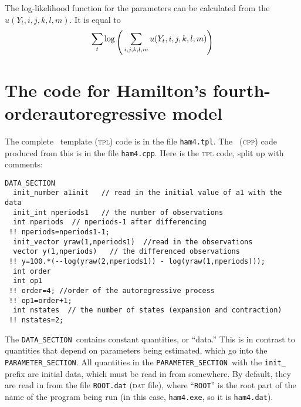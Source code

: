 \documentclass{admbmanual}
\newcommand\DS{\texttt{DATA\_SECTION}}
\newcommand\PS{\texttt{PARAMETER\_SECTION}}
\begin{document}
The log-likelihood function for the parameters can be calculated from the
$u(Y_t,i,j,k,l,m)$. It is equal to
\begin{equation}
{
\sum_t \log\raisebox{-.4em}{\Bigg(}\sum_{i,j,k,l,m}
        u(Y_t,i,j,k,l,m)\raisebox{-.4em}{\Bigg)} }
\label{chp4:xx7}
\end{equation}

\section{The code for Hamilton's fourth-order\br autoregressive model}

The complete \ADM\ template (\textsc{tpl}) code is in the file
\texttt{ham4.tpl}. The \cplus\ (\textsc{cpp}) code produced from this is in the
file \texttt{ham4.cpp}. Here is the \textsc{tpl} code, split up with comments:
\begin{lstlisting}
DATA_SECTION
  init_number a1init   // read in the initial value of a1 with the data
  init_int nperiods1   // the number of observations
  int nperiods  // nperiods-1 after differencing
 !! nperiods=nperiods1-1;
  init_vector yraw(1,nperiods1)  //read in the observations
  vector y(1,nperiods)   // the differenced observations
 !! y=100.*(--log(yraw(2,nperiods1)) - log(yraw(1,nperiods)));
  int order
  int op1
 !! order=4; //order of the autoregressive process
 !! op1=order+1;
  int nstates  // the number of states (expansion and contraction)
 !! nstates=2;
\end{lstlisting}
The \DS\ contains constant quantities, or ``data.'' This is in contrast to
quantities that depend on parameters being estimated, which go into the \PS. All
quantities in the \PS\ with the \texttt{init\_} prefix are initial data, which
must be read in from somewhere. By default, they are read in from the file
\texttt{ROOT.dat} (\textsc{dat} file), where ``\texttt{ROOT}'' is the root part
of the name of the program being run (in this case, \texttt{ham4.exe}, so it is
\texttt{ham4.dat}).
\end{document}
